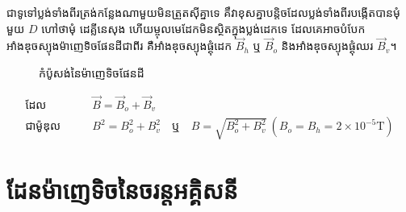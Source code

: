 	\quad ជាទូទៅប្លង់ទាំងពីរត្រង់កន្លែងណាមួយមិនត្រួតស៊ីគ្នាទេ គឹវាខុសគ្នាបន្តិចដែលប្លង់ទាំងពីរបង្កើតបានមុំមួយ $\si{D}$ ហៅថាមុំ ដេគ្លីនេសុង ហើយម្ចុលមេដែកមិនស្ថិតក្នុងប្លង់ដេកទេ ដែលគេអាចបំបែកអាំងឌុចស្យុងម៉ាញេទិចផែនដីជាពីរ គឺអាំងឌុចស្យុងផ្គុំដេក $\vec{B}_{h}$ ឬ $\vec{B}_{o}$ និងអាំងឌុចស្យុងផ្គុំឈរ $\vec{B}_{v}$។
	\begin{figure}[H]
		\centering
		\caption{កំប៉ូសង់នៃម៉ាញេទិចផែនដី}
	\end{figure}
	\begin{align*}
		\text{ដែល}\quad & \quad \vec{B}=\vec{B}_{o}+\vec{B}_{v}\\
		\text{ជាម៉ូឌុល}\quad &\quad B^{2}=B^{2}_{o}+B^{2}_{v}\quad \text{ឬ}\quad B=\sqrt{B^{2}_{o}+B^{2}_{v}}~\left(B_{o}=B_{h}=2\times10^{-5}\si{\tesla}\right)
	\end{align*}
\section{ដែនម៉ាញេទិចនៃចរន្តអគ្គិសនី}
